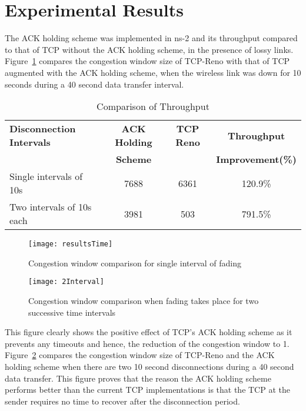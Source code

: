 \documentclass[conference]{IEEEtran}
\begin{document}
\section{Experimental Results}
\label{sec:experimental-results}
The ACK holding scheme was implemented in ns-2 and its throughput compared to that of TCP without the ACK holding scheme, in the presence of lossy links. Figure~\ref{fig:results-time} compares the congestion window size of TCP-Reno with that of TCP augmented with the ACK holding scheme, when the wireless link was down for 10 seconds during a 40 second data transfer interval. 
\begin{table}
  \centering
  \begin{tabular}{|l|c|c|c|}
    \hline
    \textbf{Disconnection Intervals} & \textbf{ACK Holding} & \textbf{TCP Reno} & \textbf{Throughput}\\
    & \textbf{Scheme} & & \textbf{Improvement(\%)}\\
    \hline
    Single intervals of 10s & 7688 & 6361 & 120.9\%\\
    Two intervals of 10s each & 3981 & 503 & 791.5\%\\
    \hline
  \end{tabular}
  \caption{Comparison of Throughput}
  \label{tab:comparison-throughput}
\end{table}
\begin{figure}
  \centering
  \texttt{[image: resultsTime]}
  \caption{Congestion window comparison for single interval of fading}
  \label{fig:results-time}
\end{figure}
\begin{figure}
  \centering
  \texttt{[image: 2Interval]}
  \caption{Congestion window comparison when fading takes place for two successive time intervals}
  \label{fig:2Interval}
\end{figure}
This figure clearly shows the positive effect of TCP's ACK holding scheme as it prevents any timeouts and hence, the reduction of the congestion window to 1. Figure~\ref{fig:2Interval} compares the congestion window size of TCP-Reno and the ACK holding scheme when there are two 10 second disconnections during a 40 second data transfer. This figure proves that the reason the ACK holding scheme performs better than the current TCP implementations is that the TCP at the sender requires no time to recover after the disconnection period. 
\end{document}
